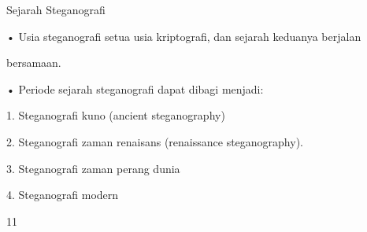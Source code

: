 \documentclass{article}
\begin{document}

Sejarah Steganografi

• Usia steganografi setua usia kriptografi, dan sejarah keduanya berjalan 

bersamaan.

• Periode sejarah steganografi dapat dibagi menjadi:

 1. Steganografi kuno (ancient steganography)

 2. Steganografi zaman renaisans (renaissance steganography).

 3. Steganografi zaman perang dunia

 4. Steganografi modern

11
\end{document}
